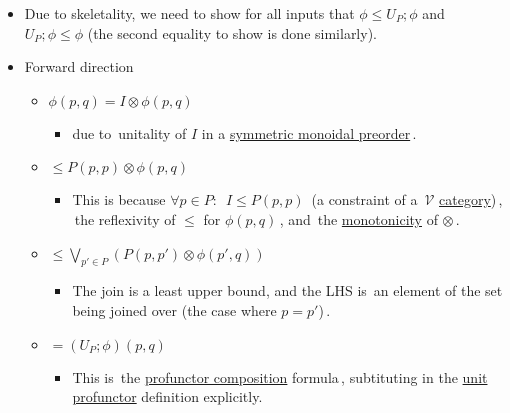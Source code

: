 \begin{itemize}
    \item Due to skeletality, we need to show for all inputs that $\phi \leq U_P;\phi$ and $U_P;\phi \leq \phi$ (the second equality to show is done similarly).
    \item Forward direction
          \begin{itemize}
            \item $\phi(p,q) = I \otimes \phi(p,q)$
                  \begin{itemize}
                    \item due to \,unitality of $I$ in a \href{doc/1 math/Seven Sketches in Compositionality/Chapter 2: Resource theories/2 Symmetric monoidal preorders/1 Definition and first examples/1 Symmetric monoidal structure on a preorder}{symmetric monoidal preorder}\,.
                  \end{itemize}
            \item $\leq P(p,p) \otimes \phi(p,q)$
                  \begin{itemize}
                    \item This is because $\forall p \in P:$ \,$I \leq P(p,p)$\, (a constraint of a \,$\mathcal{V}$ \href{doc/1 math/Seven Sketches in Compositionality/Chapter 2: Resource theories/3 Enrichment/1 V-categories/1 V-category}{category})\,, \,the reflexivity of $\leq$ for $\phi(p,q)$\,, and \,the \href{doc/1 math/Seven Sketches in Compositionality/Chapter 2: Resource theories/2 Symmetric monoidal preorders/1 Definition and first examples/1 Symmetric monoidal structure on a preorder}{monotonicity} of $\otimes$\,.
                  \end{itemize}
            \item $\leq \underset{p' \in P}\bigvee(P(p,p') \otimes \phi(p',q))$
                  \begin{itemize}
                    \item The join is a least upper bound, and the LHS is \,an element of the set being joined over (the case where $p=p'$)\,.
                  \end{itemize}
            \item $= (U_P;\phi)(p,q)$
                  \begin{itemize}
                    \item This is \,the \href{doc/1 math/Seven Sketches in Compositionality/Chapter 4: Co-design/3 Categories of profunctors/1 Composing profunctors/1 V-profunctor composition}{profunctor composition} formula\,, subtituting in the \href{doc/1 math/Seven Sketches in Compositionality/Chapter 4: Co-design/3 Categories of profunctors/2 The categories V-Prof and Feas/3 The unit profunctor}{unit profunctor} definition explicitly.

\end{itemize}
\end{itemize}
\end{itemize}
